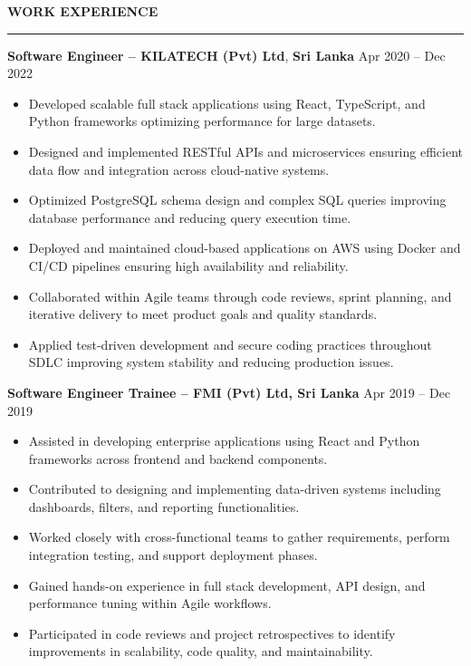 \documentclass[10pt,letterpaper]{article}
\begin{document}
\vspace{8pt}

\textbf{WORK EXPERIENCE}\\[-8pt]
\noindent\rule{\textwidth}{1pt}

\vspace{-2pt}

\textbf{Software Engineer -- KILATECH (Pvt) Ltd}, \textbf{Sri Lanka} \hfill Apr 2020 -- Dec 2022

\vspace{-1pt}

\begin{itemize}
\item Developed scalable full stack applications using React, TypeScript, and Python frameworks optimizing performance for large datasets.
\item Designed and implemented RESTful APIs and microservices ensuring efficient data flow and integration across cloud-native systems.
\item Optimized PostgreSQL schema design and complex SQL queries improving database performance and reducing query execution time.
\item Deployed and maintained cloud-based applications on AWS using Docker and CI/CD pipelines ensuring high availability and reliability.
\item Collaborated within Agile teams through code reviews, sprint planning, and iterative delivery to meet product goals and quality standards.
\item Applied test-driven development and secure coding practices throughout SDLC improving system stability and reducing production issues.
\end{itemize}

\textbf{Software Engineer Trainee -- FMI (Pvt) Ltd, Sri Lanka} \hfill Apr 2019 -- Dec 2019

\vspace{-1pt}

\begin{itemize}
\item Assisted in developing enterprise applications using React and Python frameworks across frontend and backend components.
\item Contributed to designing and implementing data-driven systems including dashboards, filters, and reporting functionalities.
\item Worked closely with cross-functional teams to gather requirements, perform integration testing, and support deployment phases.
\item Gained hands-on experience in full stack development, API design, and performance tuning within Agile workflows.
\item Participated in code reviews and project retrospectives to identify improvements in scalability, code quality, and maintainability.
\end{itemize}
\end{document}
